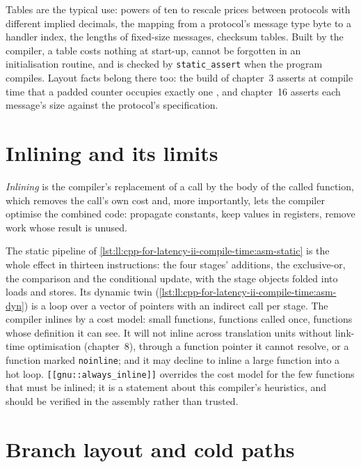 Tables are the typical use: powers of ten to rescale prices between protocols with different implied decimals, the
mapping from a protocol's message type byte to a handler index, the lengths of fixed-size messages, checksum tables. Built
by the compiler, a table costs nothing at start-up, cannot be forgotten in an initialisation routine, and is checked by
\texttt{static\_assert} when the program compiles. Layout facts belong there too: the build of chapter~3 asserts at
compile time that a padded counter occupies exactly one , and chapter~16 asserts each message's size against
the protocol's specification.

\section{Inlining and its limits}

\begin{definition}[Inlining]\label{def:ll:cpp-for-latency-ii-compile-time:inline}
\emph{Inlining} is the compiler's replacement of a call by the body of the called function, which removes
the call's own cost and, more importantly, lets the compiler optimise the combined code: propagate constants, keep values
in registers, remove work whose result is unused.
\end{definition}

The static pipeline of \cref{lst:ll:cpp-for-latency-ii-compile-time:asm-static} is the whole effect in thirteen
instructions: the four stages' additions, the exclusive-or, the comparison and the conditional update, with the stage
objects folded into loads and stores. Its dynamic twin (\cref{lst:ll:cpp-for-latency-ii-compile-time:asm-dyn}) is a loop
over a vector of pointers with an indirect call per stage. The compiler inlines by a cost model: small functions, functions
called once, functions whose definition it can see. It will not inline across translation units without link-time
optimisation (chapter~8), through a function pointer it cannot resolve, or a function marked \texttt{noinline}; and it may
decline to inline a large function into a hot loop. \texttt{[[gnu::always\_inline]]} overrides the cost model for the few
functions that must be inlined; it is a statement about this compiler's heuristics, and should be verified in the
assembly rather than trusted.

\section{Branch layout and cold paths}

